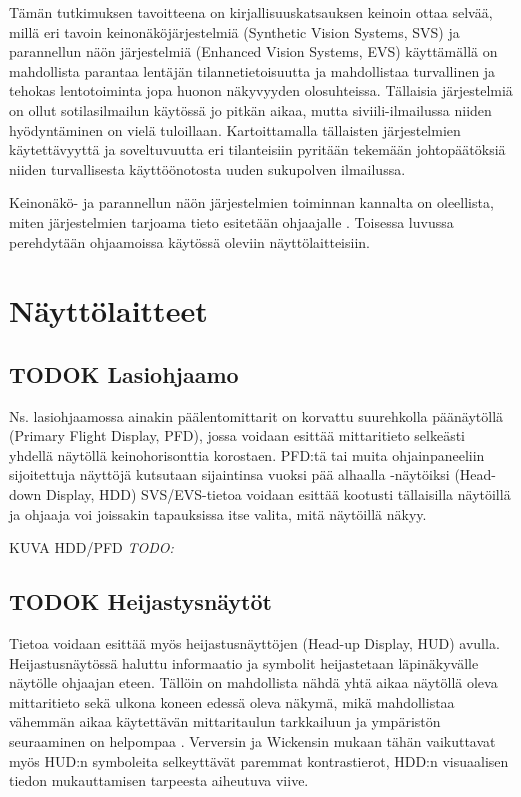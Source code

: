 \documentclass[utf8,bachelor,manualbib]{gradu3}
\begin{document}
Tämän tutkimuksen tavoitteena on kirjallisuuskatsauksen keinoin ottaa selvää, millä eri tavoin keinonäköjärjestelmiä (Synthetic Vision Systems, SVS) ja parannellun näön järjestelmiä (Enhanced Vision Systems, EVS) käyttämällä on mahdollista parantaa lentäjän tilannetietoisuutta ja mahdollistaa turvallinen ja tehokas lentotoiminta jopa huonon näkyvyyden olosuhteissa. Tällaisia järjestelmiä on ollut sotilasilmailun käytössä jo pitkän aikaa, mutta siviili-ilmailussa niiden hyödyntäminen on vielä tuloillaan. Kartoittamalla tällaisten järjestelmien käytettävyyttä ja soveltuvuutta eri tilanteisiin pyritään tekemään johtopäätöksiä niiden turvallisesta käyttöönotosta uuden sukupolven ilmailussa.

Keinonäkö- ja parannellun näön järjestelmien toiminnan kannalta on oleellista, miten järjestelmien tarjoama tieto esitetään ohjaajalle \citep{kimkaber2014}. Toisessa luvussa perehdytään ohjaamoissa käytössä oleviin näyttölaitteisiin. 

\chapter{Näyttölaitteet}

\section{TODOK Lasiohjaamo}

Ns. lasiohjaamossa ainakin päälentomittarit on korvattu suurehkolla päänäytöllä (Primary Flight Display, PFD), jossa voidaan esittää mittaritieto selkeästi yhdellä näytöllä keinohorisonttia korostaen. PFD:tä tai muita ohjainpaneeliin sijoitettuja näyttöjä kutsutaan sijaintinsa vuoksi pää alhaalla -näytöiksi (Head-down Display, HDD) SVS/EVS-tietoa voidaan esittää kootusti tällaisilla näytöillä ja ohjaaja voi joissakin tapauksissa itse valita, mitä näytöillä näkyy.

KUVA HDD/PFD \emph{TODO:}

\section{TODOK Heijastysnäytöt}

Tietoa voidaan esittää myös heijastusnäyttöjen (Head-up Display, HUD) avulla. Heijastusnäytössä haluttu informaatio ja symbolit heijastetaan läpinäkyvälle näytölle ohjaajan eteen. Tällöin on mahdollista nähdä yhtä aikaa näytöllä oleva mittaritieto sekä ulkona koneen edessä oleva näkymä, mikä mahdollistaa vähemmän aikaa käytettävän mittaritaulun tarkkailuun ja ympäristön seuraaminen on helpompaa \citep{crawfordneal2006}. Verversin ja Wickensin \citeyearpar{ververswickens1998} mukaan tähän vaikuttavat myös HUD:n symboleita selkeyttävät paremmat kontrastierot, HDD:n visuaalisen tiedon mukauttamisen tarpeesta aiheutuva viive.
\end{document}
